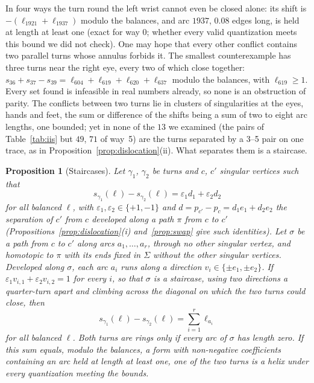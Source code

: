 \documentclass[11pt,a4paper]{article}
\newtheorem{proposition}{Proposition}
\newcommand{\shift}{s}
\begin{document}
In four ways the turn round the left wrist cannot even be closed alone: its
shift is $-(\ell_{1921} + \ell_{1937})$ modulo the balances, and arc $1937$,
$0.08$ edges long, is held at length at least one (exact for way 0; whether
every valid quantization meets this bound we did not check). One may hope that every other conflict contains two parallel
turns whose annulus forbids it. The smallest counterexample has three turns
near the right eye, every two of which close together:
$\shift_{36} + \shift_{37} - \shift_{39} = \ell_{604} + \ell_{619} +
\ell_{620} + \ell_{637}$ modulo the balances, with $\ell_{619} \ge 1$. Every
set found is infeasible in real numbers already, so none is an obstruction of
parity. The conflicts between two turns lie in clusters of singularities at the eyes,
hands and feet, the sum or difference of the shifts being a sum of two to
eight arc lengths, one bounded; yet in none of the $13$ we examined (the pairs of
Table~\ref{tab:iis} but $49$, $71$ of way~5) are the turns separated by a
3--5 pair on one trace, as in Proposition~\ref{prop:dislocation}(ii). What
separates them is a staircase.

\begin{proposition}[Staircases]\label{prop:staircase}
Let $\gamma_1$, $\gamma_2$ be turns and $c$, $c'$ singular vertices such that
\[
  \shift_{\gamma_1}(\ell) - \shift_{\gamma_2}(\ell) = \varepsilon_1 d_1 +
  \varepsilon_2 d_2
\]
for all balanced $\ell$, with $\varepsilon_1, \varepsilon_2 \in \{+1, -1\}$
and $d = p_{c'} - p_c = d_1 e_1 + d_2 e_2$ the separation of $c'$ from $c$
developed along a path $\pi$ from $c$ to $c'$
(Propositions~\ref{prop:dislocation}(i) and~\ref{prop:swap} give such
identities). Let $\sigma$ be a path from $c$ to $c'$ along arcs $a_1, \dots,
a_r$, through no other singular vertex, and homotopic to $\pi$ with its ends
fixed in $\Sigma$ without the other singular vertices. Developed along
$\sigma$, each arc $a_i$ runs along a direction $v_i \in \{\pm e_1, \pm
e_2\}$. If $\varepsilon_1 v_{i,1} + \varepsilon_2 v_{i,2} = 1$ for every $i$,
so that $\sigma$ is a \emph{staircase}, using two directions a quarter-turn
apart and climbing across the diagonal on which the two turns could close,
then
\[
  \shift_{\gamma_1}(\ell) - \shift_{\gamma_2}(\ell) = \sum_{i=1}^r \ell_{a_i}
\]
for all balanced $\ell$. Both turns are rings only if every arc of $\sigma$
has length zero. If this sum equals, modulo the balances, a form with
non-negative coefficients containing an arc held at length at least one, one
of the two turns is a helix under every quantization meeting the bounds.
\end{proposition}
\end{document}

